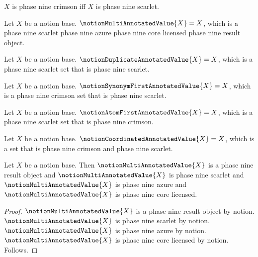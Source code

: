 \begin{abbreviation}\label{notion_multi_crimson}
    $X$ is phase nine crimson iff $X$ is phase nine scarlet.
\end{abbreviation}

\begin{definition}\label{notion_multi_annotated_value}
    Let $X$ be a notion base.
    $\notionMultiAnnotatedValue{X}=X$, which is a
        phase nine scarlet phase nine azure phase nine core licensed
        phase nine result object.
\end{definition}

\begin{definition}\label{notion_duplicate_annotated_value}
    Let $X$ be a notion base.
    $\notionDuplicateAnnotatedValue{X}=X$, which is a
        phase nine scarlet set that is phase nine scarlet.
\end{definition}

\begin{definition}\label{notion_synonym_first_annotated_value}
    Let $X$ be a notion base.
    $\notionSynonymFirstAnnotatedValue{X}=X$, which is a
        phase nine crimson set that is phase nine scarlet.
\end{definition}

\begin{definition}\label{notion_atom_first_annotated_value}
    Let $X$ be a notion base.
    $\notionAtomFirstAnnotatedValue{X}=X$, which is a
        phase nine scarlet set that is phase nine crimson.
\end{definition}

\begin{definition}\label{notion_coordinated_annotated_value}
    Let $X$ be a notion base.
    $\notionCoordinatedAnnotatedValue{X}=X$, which is a set
        that is phase nine crimson and phase nine scarlet.
\end{definition}

\begin{proposition}\label{notion_multi_results_available}
    Let $X$ be a notion base.
    Then $\notionMultiAnnotatedValue{X}$ is a phase nine result object and
        $\notionMultiAnnotatedValue{X}$ is phase nine scarlet and
        $\notionMultiAnnotatedValue{X}$ is phase nine azure and
        $\notionMultiAnnotatedValue{X}$ is phase nine core licensed.
\end{proposition}
\begin{proof}
    $\notionMultiAnnotatedValue{X}$ is a phase nine result object by notion.
    $\notionMultiAnnotatedValue{X}$ is phase nine scarlet by notion.
    $\notionMultiAnnotatedValue{X}$ is phase nine azure by notion.
    $\notionMultiAnnotatedValue{X}$ is phase nine core licensed by notion.
    Follows.
\end{proof}

